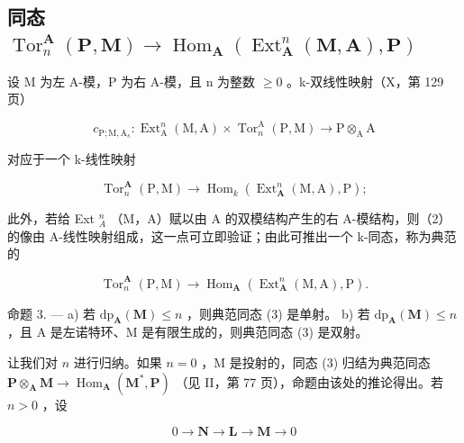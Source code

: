 \subsection{\texorpdfstring{同态 \(\operatorname{Tor}_n^{\mathbf{A}}(\mathbf{P},\mathbf{M})\to \operatorname{Hom}_{\mathbf{A}}(\operatorname{Ext}_{\mathbf{A}}^{n}(\mathbf{M},\mathbf{A}),\mathbf{P})\)}{同态 \textbackslash operatorname\{Tor\}\_n\^{}\{\textbackslash mathbf\{A\}\}(\textbackslash mathbf\{P\},\textbackslash mathbf\{M\})\textbackslash 到 \textbackslash operatorname\{Hom\}\_\{\textbackslash mathbf\{A\}\}(\textbackslash operatorname\{Ext\}\_\{\textbackslash mathbf\{A\}\}\^{}\{n\}(\textbackslash mathbf\{M\},\textbackslash mathbf\{A\}),\textbackslash mathbf\{P\})}}

设 M 为左 A-模，P 为右 A-模，且 n 为整数 \(\geqslant 0\) 。k-双线性映射（X，第 129 页）

\[
c _ {\mathrm{P}; \mathrm{M}, \mathrm{A} _ {s}}: \operatorname{Ext} _ {\mathrm{A}} ^ {n} (\mathrm{M}, \mathrm{A}) \times \operatorname{Tor} _ {n} ^ {\mathrm{A}} (\mathrm{P}, \mathrm{M}) \rightarrow \mathrm{P} \otimes_ {\mathrm{A}} \mathrm{A}
\]

对应于一个 k-线性映射

\[
\operatorname{Tor} _ {n} ^ {\mathbf {A}} (\mathrm{P}, \mathrm{M}) \rightarrow \operatorname{Hom} _ {k} \left(\operatorname{Ext} _ {\mathbf {A}} ^ {n} (\mathrm{M}, \mathrm{A}), \mathrm{P}\right);\tag{2}
\]

此外，若给 Ext \(_{A}^{n}\) （M，A）赋以由 A 的双模结构产生的右 A-模结构，则（2）的像由 A-线性映射组成，这一点可立即验证；由此可推出一个 k-同态，称为典范的

\[
\operatorname{Tor} _ {n} ^ {\mathbf {A}} (\mathrm{P}, \mathrm{M}) \rightarrow \operatorname{Hom} _ {\mathbf {A}} \left(\operatorname{Ext} _ {\mathbf {A}} ^ {n} (\mathrm{M}, \mathrm{A}), \mathrm{P}\right).\tag{3}
\]

命题 3. --- a) 若 \(\mathrm{dp}_{\mathbf{A}}(\mathbf{M}) \leqslant n\) ，则典范同态 (3) 是单射。 b) 若 \(\mathrm{dp}_{\mathbf{A}}(\mathbf{M}) \leqslant n\) ，且 A 是左诺特环、M 是有限生成的，则典范同态 (3) 是双射。

让我们对 \(n\) 进行归纳。如果 \(n = 0\) ，M 是投射的，同态 (3) 归结为典范同态 \(\mathbf{P} \otimes_{\mathbf{A}} \mathbf{M} \to \operatorname{Hom}_{\mathbf{A}} (\mathbf{M}^{*}, \mathbf{P})\) （见 II，第 77 页），命题由该处的推论得出。若 \(n > 0\) ，设

\[
0 \rightarrow \mathbf {N} \rightarrow \mathbf {L} \rightarrow \mathbf {M} \rightarrow 0\tag{4}
\]


